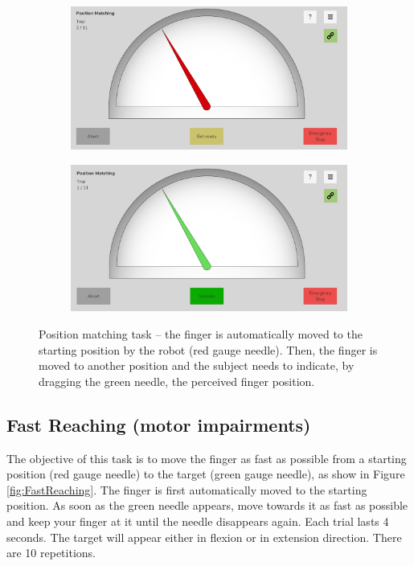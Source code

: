 \documentclass[10pt,oneside,a4paper]{article}
\begin{document}
\begin{figure}[h!]
\centering
\begin{subfigure}[b]{0.48\textwidth}
	\includegraphics[width=\textwidth]{images/Assessments/PositionMatching1.png}
\end{subfigure}
\hfill
\begin{subfigure}[b]{0.48\textwidth}
	\includegraphics[width=\textwidth]{images/Assessments/PositionMatching2.png}
\end{subfigure}
\caption{Position matching task – the finger is automatically moved to the starting position by the robot (red gauge needle). Then, the finger is moved to another position and the subject needs to indicate, by dragging the green needle, the perceived finger position.}
\label{fig:PositionMatching}
\end{figure}

\subsection{Fast Reaching (motor impairments)}
The objective of this task is to move the finger as fast as possible from a starting position (red gauge needle) to the target (green gauge needle), as show in Figure \ref{fig:FastReaching}. The finger is first automatically moved to the starting position. As soon as the green needle appears, move towards it as fast as possible and keep your finger at it until the needle disappears again. Each trial lasts 4 seconds. The target will appear either in flexion or in extension direction. There are 10 repetitions. 
\end{document}
